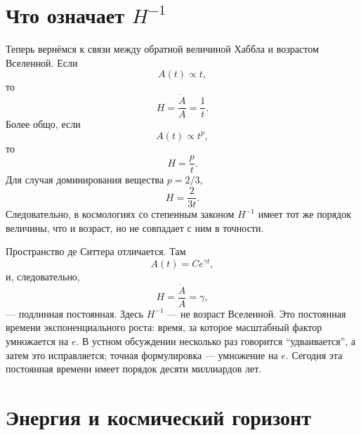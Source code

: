 \section{Что означает \(H^{-1}\)}

Теперь вернёмся к связи между обратной величиной Хаббла и возрастом Вселенной. Если
\begin{equation}
A(t)\propto t,
\end{equation}
то
\begin{equation}
H=\frac{\dot A}{A}=\frac{1}{t}.
\end{equation}
Более общо, если
\begin{equation}
A(t)\propto t^p,
\end{equation}
то
\begin{equation}
H=\frac{p}{t}.
\end{equation}
Для случая доминирования вещества \(p=2/3\),
\begin{equation}
H=\frac{2}{3t}.
\end{equation}
Следовательно, в космологиях со степенным законом \(H^{-1}\) имеет тот же порядок величины, что и возраст, но не совпадает с ним в точности.

Пространство де Ситтера отличается. Там
\begin{equation}
A(t)=C e^{\gamma t},
\end{equation}
и, следовательно,
\begin{equation}
H=\frac{\dot A}{A}=\gamma,
\end{equation}
— подлинная постоянная. Здесь \(H^{-1}\) — не возраст Вселенной. Это постоянная времени экспоненциального роста: время, за которое масштабный фактор умножается на \(e\). В устном обсуждении несколько раз говорится ``удваивается'', а затем это исправляется; точная формулировка — умножение на \(e\). Сегодня эта постоянная времени имеет порядок десяти миллиардов лет.

\begin{classroomqa}
\end{classroomqa}

\section{Энергия и космический горизонт}

